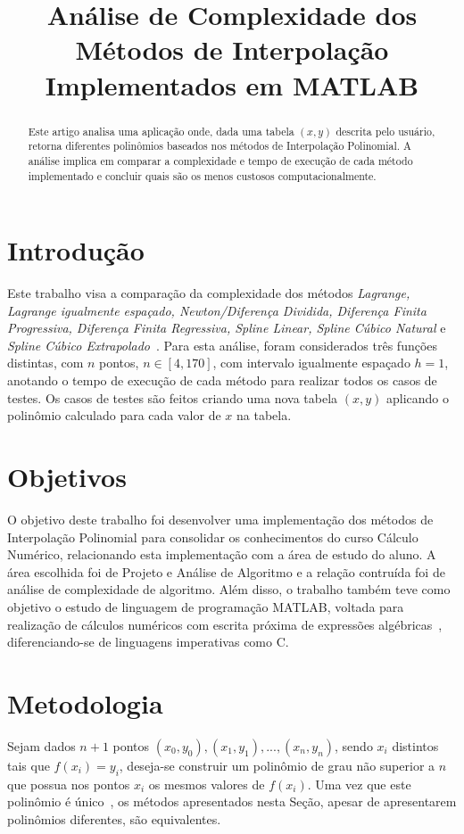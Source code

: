 \documentclass[conference]{IEEEtran}
\title{Análise de Complexidade dos Métodos de Interpolação Implementados em MATLAB}
\author{\IEEEauthorblockN{Sinayra Pascoal Cotts Moreira}
\IEEEauthorblockA{Departamento de Ciência da Computação\\Instituto de
  Ciências Exatas\\
Universidade de Brasília\\
Email:  sinayra@hotmail.com}
}
\begin{document}
 

\maketitle

     
\begin{abstract} 
  Este artigo analisa uma aplicação onde, dada uma tabela $(x,y)$ descrita pelo usuário, retorna diferentes polinômios baseados nos métodos de Interpolação Polinomial. A análise implica em comparar a complexidade e tempo de execução de cada método implementado e concluir quais são os menos custosos computacionalmente.
\end{abstract}


\section{Introdução} \label{sec:intro}

Este trabalho visa a comparação da complexidade dos métodos \emph{Lagrange, Lagrange igualmente espaçado, Newton/Diferença Dividida, Diferença Finita Progressiva, Diferença Finita Regressiva, Spline Linear, Spline Cúbico Natural} e \emph{Spline Cúbico Extrapolado}~\cite{Fred_algonum,Pamplona_calnum}. Para esta análise, foram considerados três funções distintas, com $ n $ pontos, $ n \in [4, 170] $, com intervalo igualmente espaçado $ h = 1 $, anotando o tempo de execução de cada método para realizar todos os casos de testes. Os casos de testes são feitos criando uma nova tabela $(x,y)$ aplicando o polinômio calculado para cada valor de $x$ na tabela.

\section{Objetivos} \label{sec:objetivos}

O objetivo deste trabalho foi desenvolver uma implementação dos métodos de Interpolação Polinomial para consolidar os conhecimentos do curso Cálculo Numérico, relacionando esta implementação com a área de estudo do aluno. A área escolhida foi de Projeto e Análise de Algoritmo e a relação contruída foi de análise de complexidade de algoritmo. Além disso, o trabalho também teve como objetivo o estudo de linguagem de programação MATLAB, voltada para realização de cálculos numéricos com escrita próxima de expressões algébricas~\cite{introMatlab}, diferenciando-se de linguagens imperativas como C.

\section{Metodologia} \label{sec:metodologia}
Sejam dados $ n+1$ pontos $(x_{0}, y_{0}), (x_{1},y_{1}), ..., (x_{n}, y_{n})$, sendo $x_{i}$ distintos tais que $f(x_{i}) = y_{i}$, deseja-se construir um polinômio de grau não superior a $n$ que possua nos pontos $x_{i}$ os mesmos valores de $f(x_{i})$. Uma vez que este polinômio é único~\cite{polunico}, os métodos apresentados nesta Seção, apesar de apresentarem polinômios diferentes, são equivalentes.
\end{document}
